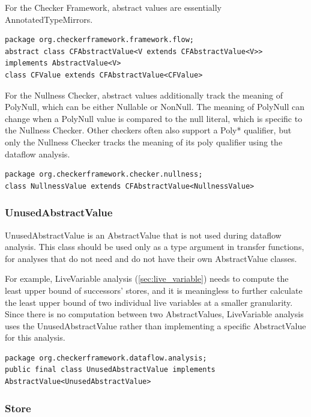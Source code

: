 For the Checker Framework, abstract values are essentially
AnnotatedTypeMirrors.

\begin{verbatim}
package org.checkerframework.framework.flow;
abstract class CFAbstractValue<V extends CFAbstractValue<V>> implements AbstractValue<V>
class CFValue extends CFAbstractValue<CFValue>
\end{verbatim}

For the Nullness Checker, abstract values additionally track the
meaning of PolyNull, which can be either Nullable or NonNull.  The
meaning of PolyNull can change when a PolyNull value is compared to
the null literal, which is specific to the Nullness Checker.  Other
checkers often also support a Poly* qualifier, but only the
Nullness Checker tracks the meaning of its poly qualifier using the
dataflow analysis.

\begin{verbatim}
package org.checkerframework.checker.nullness;
class NullnessValue extends CFAbstractValue<NullnessValue>
\end{verbatim}

\subsubsection{UnusedAbstractValue}
\label{sec:unused_abstract_value_class}

UnusedAbstractValue is an AbstractValue that is
not used during dataflow analysis. This class should
be used only as a type argument in transfer functions, for
analyses that do not need and do not have their own AbstractValue classes.

For example, LiveVariable analysis (\autoref{sec:live_variable})
needs to compute the least upper bound of successors' stores, and
it is meaningless to further calculate the least upper bound of two
individual live variables at a smaller granularity.
Since there is no computation between two AbstractValues, LiveVariable
analysis uses the UnusedAbstractValue rather than
implementing a specific AbstractValue for this analysis.

\begin{verbatim}
package org.checkerframework.dataflow.analysis;
public final class UnusedAbstractValue implements AbstractValue<UnusedAbstractValue>
\end{verbatim}

\subsubsection{Store}
\label{sec:store_classes}

